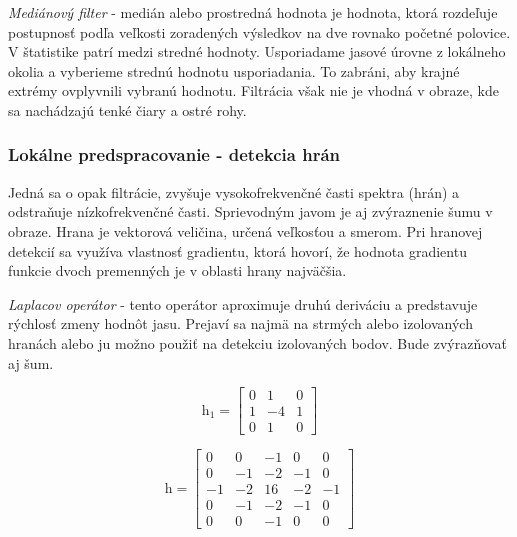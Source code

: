 \textit{Mediánový filter} - medián alebo prostredná hodnota je hodnota, ktorá rozdeľuje postupnosť podľa veľkosti zoradených výsledkov na dve rovnako početné polovice. V štatistike patrí medzi stredné hodnoty. Usporiadame jasové úrovne z lokálneho okolia a vyberieme strednú hodnotu usporiadania. To zabráni, aby krajné extrémy ovplyvnili vybranú hodnotu. Filtrácia však nie je vhodná v obraze, kde sa nachádzajú tenké čiary a ostré rohy. \cite{Detekcia_a_rozpoznavanie_objektov} 


\subsubsection{Lokálne predspracovanie - detekcia hrán}
\label{sec:edge}
Jedná sa o opak filtrácie, zvyšuje vysokofrekvenčné časti spektra (hrán) a odstraňuje nízkofrekvenčné časti. Sprievodným javom je aj zvýraznenie šumu v obraze. Hrana je vektorová veličina, určená veľkosťou a smerom. Pri hranovej detekcií sa využíva vlastnosť gradientu, ktorá hovorí, že hodnota gradientu funkcie dvoch premenných je v oblasti hrany najväčšia. \cite{Learning_openCV}
\vspace{5mm}


\textit{Laplacov operátor} - tento operátor aproximuje druhú deriváciu a predstavuje rýchlosť zmeny hodnôt jasu. Prejaví sa najmä na strmých alebo izolovaných hranách alebo ju možno použiť na detekciu izolovaných bodov. Bude zvýrazňovať aj šum. \cite{Detekcia_a_rozpoznavanie_objektov}\cite{Learning_openCV}

\vspace{5mm}

\begin{figure}[H]
    \centering
    \begin{minipage}[b]{0.49\textwidth}
        \begin{equation}
            \textit{h}_1=\begin{bmatrix} 0 & 1 & 0 \\ 1 & -4 & 1 \\ 0 & 1 & 0  \end{bmatrix}
        \end{equation}
    \end{minipage}
    \hfill
    \begin{minipage}[b]{0.49\textwidth}
        \begin{equation}
            \textit{h}=\begin{bmatrix} 0 & 0 & -1 & 0 & 0 \\ 0 & -1 & -2 & -1 & 0 \\ -1 & -2 & 16 & -2 & -1 \\ 0 & -1 & -2 & -1 & 0 \\ 0 & 0 & -1 & 0 & 0  \end{bmatrix}
        \end{equation}
    \end{minipage}
\end{figure}

